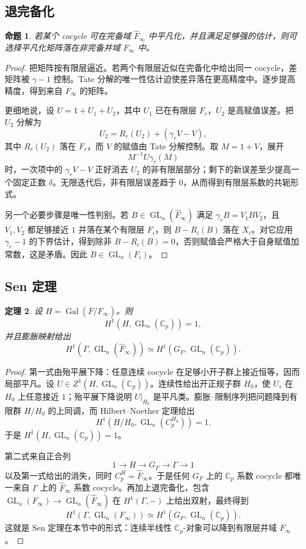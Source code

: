 \documentclass[11pt,a4paper,openany]{ctexbook}
\numberwithin{equation}{chapter}
\newcommand{\C}{\mathbb{C}}
\newcommand{\Gal}{\operatorname{Gal}}
\newcommand{\GL}{\operatorname{GL}}
\theoremstyle{plain}
\newtheorem{theorem}{定理}[chapter]
\newtheorem{proposition}[theorem]{命题}
\theoremstyle{definition}
\theoremstyle{remark}
\begin{document}
\subsection{退完备化}

\begin{proposition}
若某个 cocycle 可在完备域 $\widehat F_\infty$ 中平凡化，并且满足足够强的估计，则可选择平凡化矩阵落在非完备并域 $F_\infty$ 中。
\end{proposition}

\begin{proof}
把矩阵按有限层逼近。若两个有限层近似在完备化中给出同一 cocycle，差矩阵被 $\gamma-1$ 控制。Tate 分解的唯一性估计迫使差异落在更高精度中。逐步提高精度，得到来自 $F_\infty$ 的矩阵。

更细地说，设 $U=1+U_1+U_2$，其中 $U_1$ 已在有限层 $F_r$，$U_2$ 是高赋值误差。把 $U_2$ 分解为
\[
  U_2=R_r(U_2)+(\gamma_r V-V),
\]
其中 $R_r(U_2)$ 落在 $F_r$，而 $V$ 的赋值由 Tate 分解控制。取 $M=1+V$，展开
\[
  M^{-1}U\gamma_r(M)
\]
时，一次项中的 $\gamma_r V-V$ 正好消去 $U_2$ 的非有限层部分；剩下的新误差至少提高一个固定正数 $\delta$。无限迭代后，非有限层误差趋于 $0$，从而得到有限层系数的共轭形式。

另一个必要步骤是唯一性判别。若 $B\in\GL_n(\widehat F_\infty)$ 满足 $\gamma_r B=V_1BV_2$，且 $V_1,V_2$ 都足够接近 $1$ 并落在某个有限层 $F_i$，则 $B-R_i(B)$ 落在 $X_i$。对它应用 $\gamma_r-1$ 的下界估计，得到除非 $B-R_i(B)=0$，否则赋值会严格大于自身赋值加常数，这是矛盾。因此 $B\in\GL_n(F_i)$。
\end{proof}

\subsection{Sen 定理}

\begin{theorem}
设 $H=\Gal(\overline F/F_\infty)$。则
\[
  H^1(H,\GL_n(\C_p))=1,
\]
并且膨胀映射给出
\[
  H^1(\Gamma,\GL_n(\widehat F_\infty))
  \simeq H^1(G_F,\GL_n(\C_p)).
\]
\end{theorem}

\begin{proof}
第一式由殆平展下降：任意连续 cocycle 在足够小开子群上接近恒等，因而局部平凡。设 $U\in Z^1(H,\GL_n(\C_p))$。连续性给出开正规子群 $H_0$，使 $U_s$ 在 $H_0$ 上任意接近 $1$；殆平展下降说明 $U|_{H_0}$ 是平凡类。膨胀--限制序列把问题降到有限群 $H/H_0$ 的上同调，而 Hilbert--Noether 定理给出
\[
  H^1(H/H_0,\GL_n(C_p^{H_0}))=1.
\]
于是 $H^1(H,\GL_n(\C_p))=1$。

第二式来自正合列
\[
  1\to H\to G_F\to\Gamma\to1
\]
以及第一式给出的消失，同时 $C_p^H=\widehat F_\infty$。于是任何 $G_F$ 上的 $\C_p$ 系数 cocycle 都唯一来自 $\Gamma$ 上的 $\widehat F_\infty$ 系数 cocycle。再加上退完备化，包含 $\GL_n(F_\infty)\to\GL_n(\widehat F_\infty)$ 在 $H^1(\Gamma,-)$ 上给出双射，最终得到
\[
  H^1(\Gamma,\GL_n(F_\infty))
  \simeq H^1(G_F,\GL_n(\C_p)).
\]
这就是 Sen 定理在本节中的形式：连续半线性 $\C_p$-对象可以降到有限层并域 $F_\infty$。
\end{proof}
\end{document}
